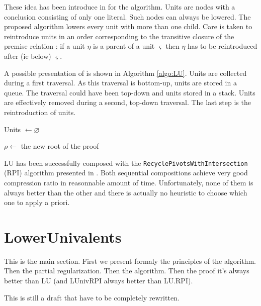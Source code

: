 \documentclass{llncs}
\begin{document}
These idea has been introduce in \cite{LURPI} for the {\LowerUnits} algorithm. Units are nodes with a
conclusion consisting of only one literal. Such nodes can always be lowered. The proposed algorithm
lowers every unit with more than one child. Care is taken to reintroduce units in an order
corresponding to the transitive closure of the premise relation : if a unit $\eta$ is a parent of a
unit $\varsigma$ then $\eta$ has to be reintroduced after (ie below) $\varsigma$.

A possible presentation of {\LowerUnits} is shown in Algorithm \ref{algo:LU}. Units are collected during a
first traversal. As this traversal is bottom-up, units are stored in a queue. The traversal could
have been top-down and units stored in a stack. Units are effectively removed during a second,
top-down traversal. The last step is the reintroduction of units.

\begin{algorithm}[tb]
  Units $\leftarrow \varnothing$ \;



  $\rho \leftarrow$ the new root of the proof \;

  \label{algo:LU}
  \caption{\LowerUnits}
\end{algorithm}

LU has been successfully composed with the \texttt{RecyclePivotsWithIntersection} (RPI) algorithm
presented in \cite{LURPI}. Both sequential compositions achieve very good compression ratio in
reasonnable amount of time. Unfortunately, none of them is always better than the other and there is
actually no heuristic to choose which one to apply a priori.

\section{LowerUnivalents}

\begin{jb}
This is the main section. First we present formaly the principles of the algorithm. Then the partial
regularization. Then the algorithm. Then the proof it's always better than LU (and LUnivRPI always
better than LU.RPI).

This is still a draft that have to be completely rewritten.
\end{jb}
\end{document}
